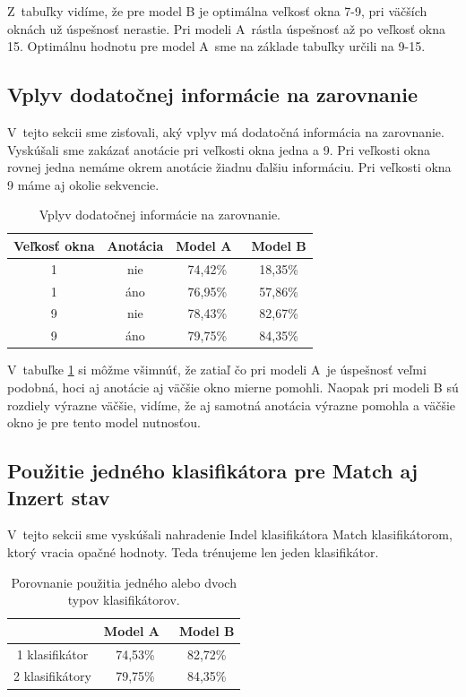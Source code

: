 Z~tabuľky vidíme, že pre model B je optimálna veľkosť okna 7-9, pri väčších oknách už úspešnosť nerastie. Pri modeli A~rástla úspešnosť až po veľkosť okna 15. Optimálnu hodnotu pre model A~sme na základe tabuľky určili na 9-15.

\subsection{Vplyv dodatočnej informácie na zarovnanie}

V~tejto sekcii sme zisťovali, aký vplyv má dodatočná informácia na zarovnanie. Vyskúšali sme zakázať anotácie pri veľkosti okna jedna a 9. Pri veľkosti okna rovnej jedna nemáme okrem anotácie žiadnu ďalšiu informáciu. Pri veľkosti okna 9 máme aj okolie sekvencie.

\begin{table}[htp]
\centering
\begin{tabular}{cccc}
\toprule
Veľkosť okna & Anotácia & Model A~& Model B\\
\midrule
1 & nie & 74,42\% & 18,35\%\\
1 & áno & 76,95\% & 57,86\%\\
9 & nie & 78,43\% & 82,67\%\\
9 & áno & 79,75\% & 84,35\%\\
\bottomrule
\end{tabular}
\caption[Vplyv dodatočnej informácie na zarovnanie]{Vplyv dodatočnej informácie na zarovnanie.}
\label{tab:annotation-compare}
\end{table}

V~tabuľke \ref{tab:annotation-compare} si môžme všimnúť, že zatiaľ čo pri modeli A~je úspešnosť veľmi podobná, hoci aj anotácie aj väčšie okno mierne pomohli. Naopak pri modeli B sú rozdiely výrazne väčšie, vidíme, že aj samotná anotácia výrazne pomohla a väčšie okno je pre tento model nutnosťou.

\subsection{Použitie jedného klasifikátora pre Match aj Inzert stav}

V~tejto sekcii sme vyskúšali nahradenie Indel klasifikátora Match klasifikátorom, ktorý vracia opačné hodnoty. Teda trénujeme len jeden klasifikátor.

\begin{table}[htp]
\centering
\begin{tabular}{ccc}
\toprule
 & Model A~& Model B\\
\midrule
1 klasifikátor & 74,53\% & 82,72\%\\
2 klasifikátory & 79,75\% & 84,35\%\\
\bottomrule
\end{tabular}
\caption[Porovnanie použitia jedného alebo dvoch typov klasifikátorov]{Porovnanie použitia jedného alebo dvoch typov klasifikátorov.}
\label{tab:1clf-compare}
\end{table}

